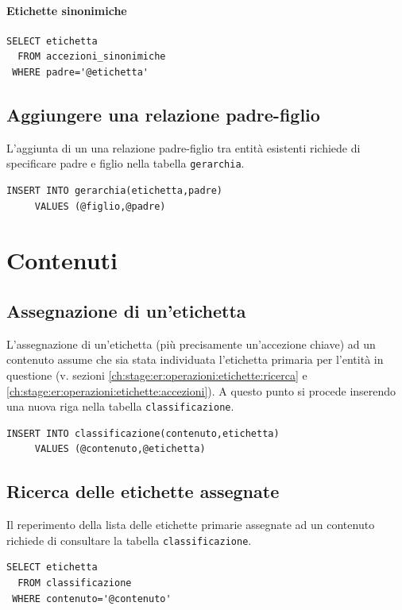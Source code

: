 \documentclass[10pt,a4paper,headinclude,footinclude,hidelinks]{scrreprt} %
\begin{document}
	\paragraph{Etichette sinonimiche}
\begin{verbatim}
SELECT etichetta
  FROM accezioni_sinonimiche
 WHERE padre='@etichetta'
\end{verbatim}

	\subsection{Aggiungere una relazione padre-figlio}
	L'aggiunta di un una relazione padre-figlio tra entità esistenti richiede di specificare padre e figlio nella tabella \texttt{gerarchia}.
\begin{verbatim}
INSERT INTO gerarchia(etichetta,padre)
     VALUES (@figlio,@padre)
\end{verbatim}
	

	\section{Contenuti}
	\subsection{Assegnazione di un'etichetta}
	L'assegnazione di un'etichetta (più precisamente un'accezione chiave) ad un contenuto assume che sia stata individuata l'etichetta primaria per l'entità in questione (v. sezioni \ref{ch:stage:er:operazioni:etichette:ricerca} e \ref{ch:stage:er:operazioni:etichette:accezioni}). A questo punto si procede inserendo una nuova riga nella tabella \texttt{classificazione}.
\begin{verbatim}
INSERT INTO classificazione(contenuto,etichetta)
     VALUES (@contenuto,@etichetta)
\end{verbatim}

	\subsection{Ricerca delle etichette assegnate}
	Il reperimento della lista delle etichette primarie	assegnate ad un contenuto richiede di consultare la tabella \texttt{classificazione}.
\begin{verbatim}
SELECT etichetta
  FROM classificazione
 WHERE contenuto='@contenuto'
\end{verbatim}
\end{document}
